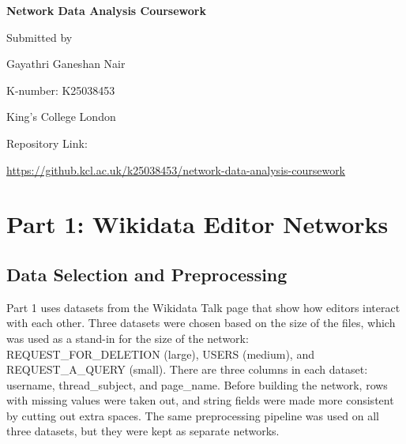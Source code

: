 \documentclass[acmsmall,nonacm,natbib=false]{acmart}
\begin{document}
\begin{titlepage}
    \centering
    \vspace*{2cm}

    {\Huge \textbf{Network Data Analysis Coursework}\par}
    \vspace{1.5cm}

    {\large Submitted by\par}
    \vspace{0.3cm}
    {\Large Gayathri Ganeshan Nair\par}
    \vspace{0.5cm}

    {\large K-number: K25038453\par}
    \vspace{0.5cm}

    {\large King's College London\par}
    \vspace{1cm}

    {\large Repository Link:\par}
    \vspace{0.3cm}
    {\normalsize \url{https://github.kcl.ac.uk/k25038453/network-data-analysis-coursework}\par}

    
\end{titlepage}





\section{\LARGE{Part 1: Wikidata Editor Networks}}


\subsection{\large{Data Selection and Preprocessing}}

Part 1 uses datasets from the Wikidata Talk page that show how editors interact with each other. Three datasets were chosen based on the size of the files, which was used as a stand-in for the size of the network: REQUEST\_FOR\_DELETION (large), USERS (medium), and REQUEST\_A\_QUERY (small). There are three columns in each dataset:
username, thread\_subject, and page\_name. Before building the network, rows with missing values were taken out, and string fields were made more consistent by cutting out extra spaces. The same preprocessing pipeline was used on all three datasets, but they were kept as separate networks.
\end{document}
